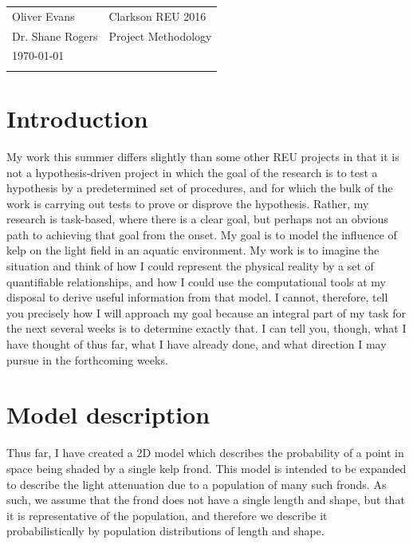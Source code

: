 \documentclass[10pt]{article}
\begin{document}
\noindent
\begin{tabular}{ll}
	Oliver Evans        & Clarkson REU 2016    \\
	Dr. Shane Rogers    & Project Methodology  \\
	\today \\[-0.75em]  &
\end{tabular}

\renewcommand{\arraystretch}{1.5}

\begin{multicols}{2}

\section{Introduction}
My work this summer differs slightly than some other REU projects in that it is not a hypothesis-driven project in which the goal of the research is to test a hypothesis by a predetermined set of procedures, and for which the bulk of the work is carrying out tests to prove or disprove the hypothesis.
 Rather, my research is task-based, where there is a clear goal, but perhaps not an obvious path to achieving that goal from the onset.
 My goal is to model the influence of kelp on the light field in an aquatic environment.
 My work is to imagine the situation and think of how I could represent the physical reality by a set of quantifiable relationships, and how I could use the computational tools at my disposal to derive useful information from that model.
 I cannot, therefore, tell you precisely how I will approach my goal because an integral part of my task for the next several weeks is to determine exactly that.
 I can tell you, though, what I have thought of thus far, what I have already done, and what direction I may pursue in the forthcoming weeks.

\section{Model description}
Thus far, I have created a 2D model which describes the probability of a point in space being shaded by a single kelp frond.
 This model is intended to be expanded to describe the light attenuation due to a population of many such fronds.
 As such, we assume that the frond does not have a single length and shape, but that it is representative of the population, and therefore we describe it probabilistically by population distributions of length and shape.


\end{multicols}
\end{document}
